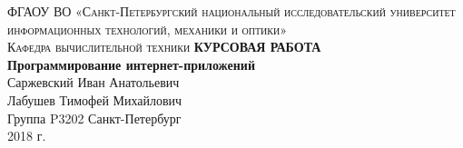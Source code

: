 \begin{titlepage}
\begin{center}

\textsc{ФГАОУ ВО «Санкт-Петербургский национальный исследовательский университет информационных технологий, механики и оптики»\\[4mm]
Кафедра вычислительной техники}
\vfill
\textbf{КУРСОВАЯ РАБОТА\\[4mm]
Программирование интернет-приложений}\\[16mm]
Саржевский Иван Анатольевич
\\[2mm]Лабушев Тимофей Михайлович
\\[2mm]Группа P3202
\vfill
Санкт-Петербург\\[2mm]
2018 г.

\end{center}
\end{titlepage}
